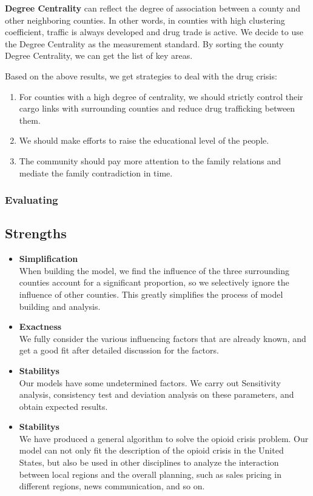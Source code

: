 \documentclass{mcmthesis}
\begin{document}
\textbf{Degree Centrality} can reflect the degree of association between a county and other neighboring counties. In other words, in counties with high clustering coefficient, traffic is always developed and drug trade is active. We decide to use the Degree Centrality as the measurement standard. By sorting the county Degree Centrality, we can get the list of key areas.

Based on the above results, we get strategies to deal with the drug crisis:

\begin{enumerate}
	\item For counties with a high degree of centrality, we should strictly control their cargo links with surrounding counties and reduce drug trafficking between them.
	\item We should make efforts to raise the educational level of the people.
	\item The community should pay more attention to the family relations and mediate the family contradiction in time.
\end{enumerate}

\subsubsection{Evaluating}

\subsection{Strengths}
\begin{itemize}
	\item \textbf{Simplification}\\
	When building the model, we find the influence of the three surrounding counties account for a significant proportion, so we selectively ignore the influence of other counties. This greatly simplifies the process of model building and analysis.
	\item \textbf{Exactness}\\
	We fully consider the various influencing factors that are already known, and get a good fit after detailed discussion for the factors.
	\item \textbf{Stabilitys}\\
	Our models have some undetermined factors. We carry out Sensitivity analysis, consistency test and deviation analysis on these parameters, and obtain expected results.
	\item \textbf{Stabilitys}\\
	We have produced a general algorithm to solve the opioid crisis problem. Our model can not only fit the description of the opioid crisis in the United States, but also be used in other disciplines to analyze the interaction between local regions and the overall planning, such as sales pricing in different regions, news communication, and so on.
\end{itemize}
\end{document}
